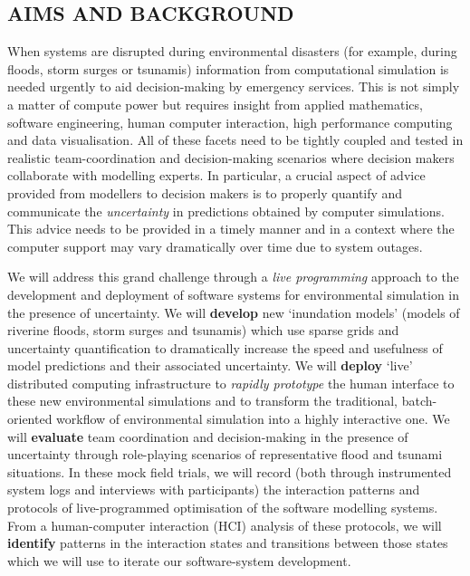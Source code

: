 \subsection*{AIMS AND BACKGROUND}

When systems are disrupted during environmental disasters (for example,
during floods, storm surges or tsunamis) information from
computational simulation is needed urgently to aid decision-making by
emergency services. This is not simply a matter of compute power but
requires insight from applied mathematics, software
engineering, human computer interaction, high performance computing
and data visualisation. All of these facets need to be tightly coupled
and tested in realistic team-coordination and decision-making
scenarios where decision makers collaborate with modelling experts. In
particular, a crucial aspect of advice provided from modellers to
decision makers is to properly quantify and communicate the
\emph{uncertainty} in predictions obtained by computer simulations.
This advice needs to be provided in a timely manner and in a context
where the computer support may vary dramatically over time due to
system outages.

We will address this grand challenge through a \emph{live programming}
approach to the development and deployment of software systems for
environmental simulation in the presence of uncertainty. We will
\textbf{develop} new `inundation models' (models of riverine floods,
storm surges and tsunamis) which use sparse grids and uncertainty
quantification to dramatically increase the speed and usefulness of
model predictions and their associated uncertainty. We will
\textbf{deploy} `live' distributed computing infrastructure to
\emph{rapidly prototype} the human interface to these new
environmental simulations and to transform the traditional,
batch-oriented workflow of environmental simulation into a highly
interactive one. We will \textbf{evaluate} team coordination and
decision-making in the presence of uncertainty through role-playing
scenarios of representative flood and tsunami situations. In these mock
field trials, we will record (both through instrumented system logs
and interviews with participants) the interaction patterns and
protocols of live-programmed optimisation of the software modelling
systems. From a human-computer interaction (HCI) analysis of these
protocols, we will \textbf{identify} patterns in the interaction
states and transitions between those states which we will use to
iterate our software-system development.

